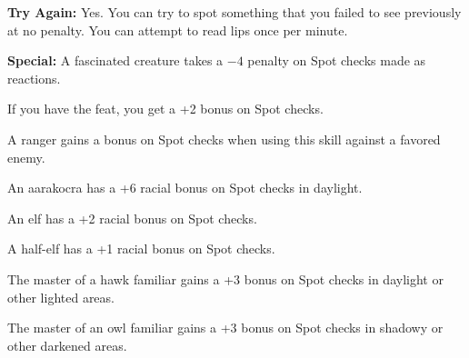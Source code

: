 \textbf{Try Again:} Yes. You can try to spot something that you failed to see previously at no penalty. You can attempt to read lips once per minute.

\textbf{Special:} A fascinated creature takes a $-4$ penalty on Spot checks made as reactions.

If you have the  feat, you get a +2 bonus on Spot checks.

A ranger gains a bonus on Spot checks when using this skill against a favored enemy.

An aarakocra has a +6 racial bonus on Spot checks in daylight.

An elf has a +2 racial bonus on Spot checks.

A half-elf has a +1 racial bonus on Spot checks.

The master of a hawk familiar gains a +3 bonus on Spot checks in daylight or other lighted areas.

The master of an owl familiar gains a +3 bonus on Spot checks in shadowy or other darkened areas.

